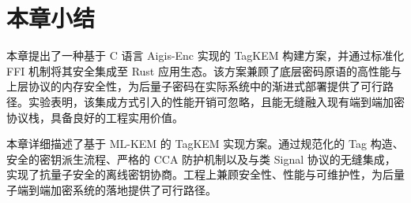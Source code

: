 \section{本章小结}
本章提出了一种基于 C 语言 Aigis-Enc 实现的 TagKEM 构建方案，并通过标准化 FFI 机制将其安全集成至 Rust 应用生态。该方案兼顾了底层密码原语的高性能与上层协议的内存安全性，为后量子密码在实际系统中的渐进式部署提供了可行路径。实验表明，该集成方式引入的性能开销可忽略，且能无缝融入现有端到端加密协议栈，具备良好的工程实用价值。


本章详细描述了基于 ML-KEM 的 TagKEM 实现方案。通过规范化的 Tag 构造、安全的密钥派生流程、严格的 CCA 防护机制以及与类 Signal 协议的无缝集成，实现了抗量子安全的离线密钥协商。工程上兼顾安全性、性能与可维护性，为后量子端到端加密系统的落地提供了可行路径。